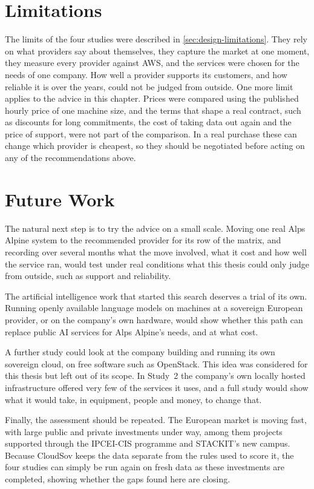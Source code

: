 \section{Limitations}
\label{sec:limitations}

The limits of the four studies were described in \cref{sec:design-limitations}.
They rely on what providers say about themselves, they capture the market at one
moment, they measure every provider against \acs{AWS}, and the services were chosen
for the needs of one company. How well a provider supports its customers, and how
reliable it is over the years, could not be judged from outside. One more limit
applies to the advice in this chapter. Prices were compared using the published
hourly price of one machine size, and the terms that shape a real contract, such
as discounts for long commitments, the cost of taking data out again and the price
of support, were not part of the comparison. In a real purchase these can change
which provider is cheapest, so they should be negotiated before acting on any of
the recommendations above.

\section{Future Work}
\label{sec:future-work}

The natural next step is to try the advice on a small scale. Moving one real
Alps Alpine system to the recommended provider for its row of the matrix, and
recording over several months what the move involved, what it cost and how well
the service ran, would test under real conditions what this thesis could only
judge from outside, such as support and reliability.

The artificial intelligence work that started this search deserves a trial of its
own. Running openly available language models on machines at a sovereign European
provider, or on the company's own hardware, would show whether this path can
replace public \acs{AI} services for Alps Alpine's needs, and at what cost.

A further study could look at the company building and running its own sovereign
cloud, on free software such as OpenStack. This idea was considered for this
thesis but left out of its scope. In Study~2 the company's own locally hosted
infrastructure offered very few of the services it uses, and a full study would
show what it would take, in equipment, people and money, to change that.

Finally, the assessment should be repeated. The European market is moving fast,
with large public and private investments under way, among them projects
supported through the \acs{IPCEI}-CIS programme \cite{IPCEI_CIS_2023} and
STACKIT's new campus. Because CloudSov keeps the data separate from the rules used
to score it, the four studies can simply be run again on fresh data as these
investments are completed, showing whether the gaps found here are closing.
